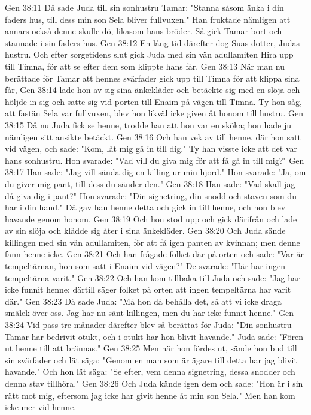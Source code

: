 Gen 38:11  Då sade Juda till sin sonhustru Tamar: "Stanna såsom änka i din faders hus, till dess min son Sela bliver fullvuxen." Han fruktade nämligen att annars också denne skulle dö, likasom hans bröder. Så gick Tamar bort och stannade i sin faders hus.
Gen 38:12  En lång tid därefter dog Suas dotter, Judas hustru. Och efter sorgetidens slut gick Juda med sin vän adullamiten Hira upp till Timna, för att se efter dem som klippte hans får.
Gen 38:13  När man nu berättade för Tamar att hennes svärfader gick upp till Timna för att klippa sina får,
Gen 38:14  lade hon av sig sina änkekläder och betäckte sig med en slöja och höljde in sig och satte sig vid porten till Enaim på vägen till Timna. Ty hon såg, att fastän Sela var fullvuxen, blev hon likväl icke given åt honom till hustru.
Gen 38:15  Då nu Juda fick se henne, trodde han att hon var en sköka; hon hade ju nämligen sitt ansikte betäckt.
Gen 38:16  Och han vek av till henne, där hon satt vid vägen, och sade: "Kom, låt mig gå in till dig." Ty han visste icke att det var hans sonhustru. Hon svarade: "Vad vill du giva mig för att få gå in till mig?"
Gen 38:17  Han sade: "Jag vill sända dig en killing ur min hjord." Hon svarade: "Ja, om du giver mig pant, till dess du sänder den."
Gen 38:18  Han sade: "Vad skall jag då giva dig i pant?" Hon svarade: "Din signetring, din snodd och staven som du har i din hand." Då gav han henne detta och gick in till henne, och hon blev havande genom honom.
Gen 38:19  Och hon stod upp och gick därifrån och lade av sin slöja och klädde sig åter i sina änkekläder.
Gen 38:20  Och Juda sände killingen med sin vän adullamiten, för att få igen panten av kvinnan; men denne fann henne icke.
Gen 38:21  Och han frågade folket där på orten och sade: "Var är tempeltärnan, hon som satt i Enaim vid vägen?" De svarade: "Här har ingen tempeltärna varit."
Gen 38:22  Och han kom tillbaka till Juda och sade: "Jag har icke funnit henne; därtill säger folket på orten att ingen tempeltärna har varit där."
Gen 38:23  Då sade Juda: "Må hon då behålla det, så att vi icke draga smälek över oss. Jag har nu sänt killingen, men du har icke funnit henne."
Gen 38:24  Vid pass tre månader därefter blev så berättat för Juda: "Din sonhustru Tamar har bedrivit otukt, och i otukt har hon blivit havande." Juda sade: "Fören ut henne till att brännas."
Gen 38:25  Men när hon fördes ut, sände hon bud till sin svärfader och lät säga: "Genom en man som är ägare till detta har jag blivit havande." Och hon lät säga: "Se efter, vem denna signetring, dessa snodder och denna stav tillhöra."
Gen 38:26  Och Juda kände igen dem och sade: "Hon är i sin rätt mot mig, eftersom jag icke har givit henne åt min son Sela." Men han kom icke mer vid henne.
